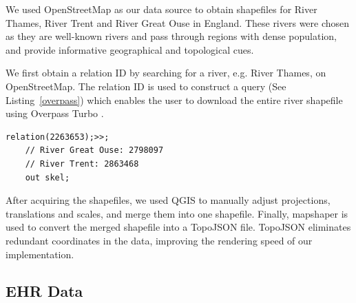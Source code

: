  We used OpenStreetMap \cite{openstreetmapRelation} as our data source to obtain shapefiles for River Thames, River Trent and River Great Ouse in England. These rivers were chosen as they are well-known rivers and pass through regions with dense population, and provide informative geographical and topological cues.

We first obtain a relation ID by searching for a river, e.g. River Thames, on OpenStreetMap. The relation ID is used to construct a query (See Listing~\ref{overpass}) which enables the user to download the entire river shapefile using Overpass Turbo \cite{overpassturboOverpass}.

\begin{lstlisting}[caption={The query that downloads the shapefile of River Thames from OpenStreetMap via the Overpass Turbo API.}, label={overpass},captionpos=b]
    relation(2263653);>>;
    // River Great Ouse: 2798097
    // River Trent: 2863468
    out skel;
\end{lstlisting}

After acquiring the shapefiles, we used QGIS \cite{qgisWelcome} to manually adjust projections, translations and scales, and merge them into one shapefile. Finally, mapshaper \cite{blochMapshaper} is used to convert the merged shapefile into a TopoJSON \cite{TopoJSON} file. TopoJSON eliminates redundant coordinates in the data, improving the rendering speed of our implementation.

\subsection{EHR Data}

